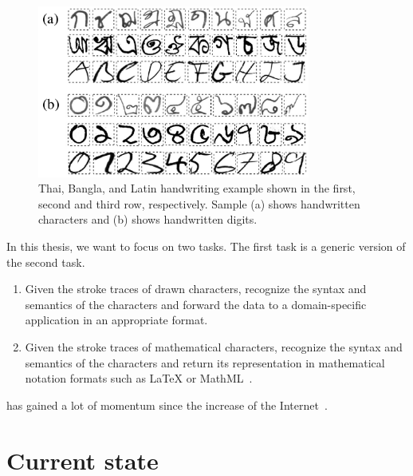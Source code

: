 \begin{figure}[!h]
  \begin{center}
    \includegraphics[width=0.8\textwidth]{img/thai-bangla-latin-handwriting.png}
    \caption{
      Thai, Bangla, and Latin handwriting example shown in the first, second and third row, respectively.
      Sample (a) shows handwritten characters and (b) shows handwritten digits.
    }
    \label{fig:tbl-examples}
  \end{center}
\end{figure}

In this thesis, we want to focus on two tasks. The first task is a generic version of the second task.
\begin{enumerate}
  \item Given the stroke traces of drawn characters, recognize the syntax and semantics of the characters and forward the data to a domain-specific application in an appropriate format.
  \item Given the stroke traces of mathematical characters, recognize the syntax and semantics of the characters and return its representation in mathematical notation formats such as \LaTeX{} or MathML~\cite{MathML}.
\end{enumerate}
has gained a lot of momentum since the increase of the Internet~\cite{chan2000mathematical}.



\section{Current state}
%

